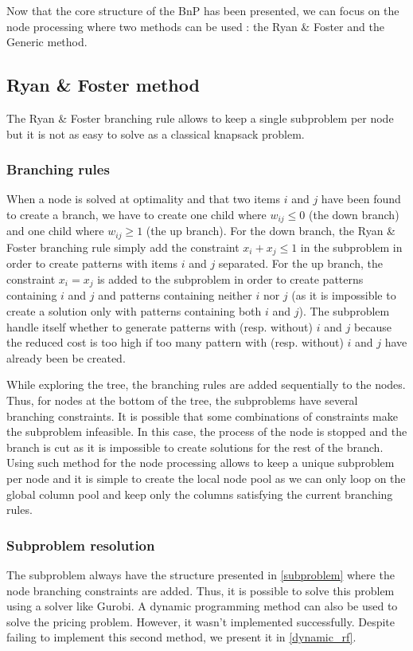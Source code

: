 Now that the core structure of the BnP has been presented, we can focus on the node processing where two methods can be used : the Ryan \& Foster and the Generic method.

\subsection{Ryan \& Foster method}
\label{ryan-foster}

The Ryan \& Foster branching rule allows to keep a single subproblem per node but it is not as easy to solve as a classical knapsack problem. 

\subsubsection{Branching rules}

When a node is solved at optimality and that two items $i$ and $j$ have been found to create a branch, we have to create one child where $w_{ij} \leq 0$ (the down branch) and one child where $w_{ij} \geq 1$ (the up branch). For the down branch, the Ryan \& Foster branching rule simply add the constraint $x_i + x_j \leq 1$ in the subproblem in order to create patterns with items $i$ and $j$ separated. For the up branch, the constraint $x_i = x_j$ is added to the subproblem in order to create patterns containing $i$ and $j$ and patterns containing neither $i$ nor $j$ (as it is impossible to create a solution only with patterns containing both $i$ and $j$). The subproblem handle itself whether to generate patterns with (resp. without) $i$ and $j$ because the reduced cost is too high if too many pattern with (resp. without) $i$ and $j$ have already been be created.

While exploring the tree, the branching rules are added sequentially to the nodes. Thus, for nodes at the bottom of the tree, the subproblems have several branching constraints. It is possible that some combinations of constraints make the subproblem infeasible. In this case, the process of the node is stopped and the branch is cut as it is impossible to create solutions for the rest of the branch. Using such method for the node processing allows to keep a unique subproblem per node and it is simple to create the local node pool as we can only loop on the global column pool and keep only the columns satisfying the current branching rules.

\subsubsection{Subproblem resolution}

The subproblem always have the structure presented in \ref{subproblem} where the node branching constraints are added. Thus, it is possible to solve this problem using a solver like Gurobi. A dynamic programming method can also be used to solve the pricing problem. However, it wasn't implemented successfully. Despite failing to implement this second method, we present it in \ref{dynamic_rf}. 